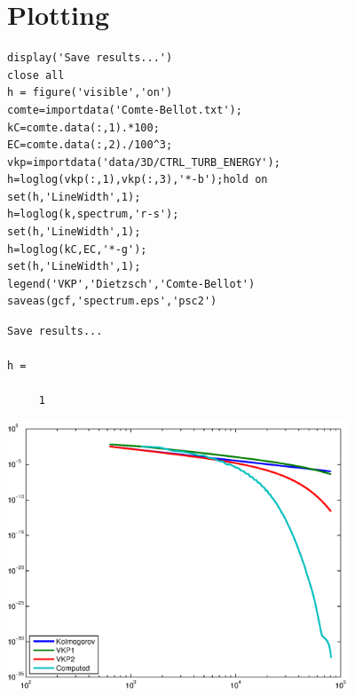 \documentclass[preprint,12pt,ntfdMod]{elsarticle}
\begin{document}
\section{Plotting}

\begin{verbatim}
display('Save results...')
close all
h = figure('visible','on')
comte=importdata('Comte-Bellot.txt');
kC=comte.data(:,1).*100;
EC=comte.data(:,2)./100^3;
vkp=importdata('data/3D/CTRL_TURB_ENERGY');
h=loglog(vkp(:,1),vkp(:,3),'*-b');hold on
set(h,'LineWidth',1);
h=loglog(k,spectrum,'r-s');
set(h,'LineWidth',1);
h=loglog(kC,EC,'*-g');
set(h,'LineWidth',1);
legend('VKP','Dietzsch','Comte-Bellot')
saveas(gcf,'spectrum.eps','psc2')
\end{verbatim}

        \color{lightgray} \begin{verbatim}Save results...

h =

     1

\end{verbatim} \color{black}
    
\includegraphics [width=4in]{spectrum_3d_01.eps}
\end{document}
